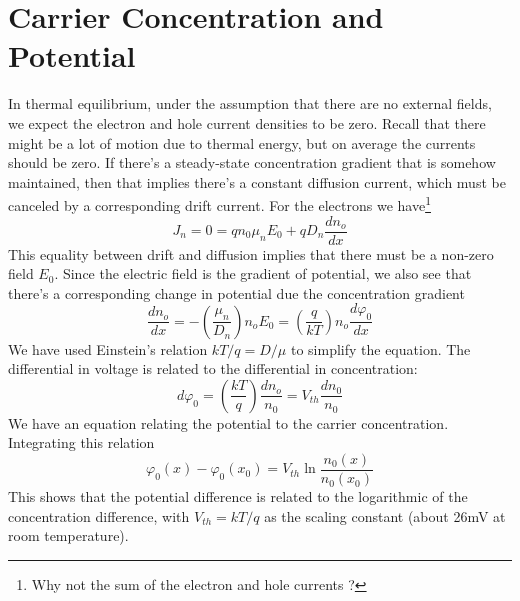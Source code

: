 \section{Carrier Concentration and Potential}
In thermal equilibrium, under the assumption that there are no external fields, we expect the electron and hole current densities to be zero.  Recall that there might be a lot of motion due to thermal energy, but on average the currents should be zero.  If there's a steady-state concentration gradient that is somehow maintained, then that implies there's a constant diffusion current, which must be canceled by a corresponding drift current.  For the electrons we have\footnote{Why not the sum of the electron and hole currents ?}
\begin{equation}
	{J_n} = 0 = q{n_0}{\mu _n}{E_0} + q{D_n}\frac{{d{n_o}}}{{dx}} 
\end{equation}
This equality between drift and diffusion implies that there must be a non-zero field $E_0$.  Since the electric field is the gradient of potential, we also see that there's a corresponding change in potential due the concentration gradient
\begin{equation} 
	\frac{{d{n_o}}}{{dx}} =  - \left( {\frac{{{\mu _n}}}{{{D_n}}}} \right){n_o}{E_0} = \left( {\frac{q}{{kT}}} \right){n_o}\frac{{d{\varphi _0}}}{{dx}} 
\end{equation}
We have used Einstein's relation $kT/q = D/\mu$ to simplify the equation.   The differential in voltage is related to the differential in concentration:
\begin{equation} 
	d{\varphi _0} = \left( {\frac{{kT}}{q}} \right)\frac{{d{n_o}}}{{{n_0}}} = {V_{th}}\frac{{d{n_0}}}{{{n_0}}} 
\end{equation}
We have an equation relating the potential to the carrier concentration.  Integrating this relation
\begin{equation} {\varphi _0}(x) - {\varphi _0}({x_0}) = {V_{th}}\ln 
	\frac{{{n_0}(x)}}{{{n_0}({x_0})}}
\end{equation}
This shows that the potential difference is related to the logarithmic  of the concentration difference, with $V_{th} = kT/q$ as the scaling constant (about 26mV at room temperature). 


